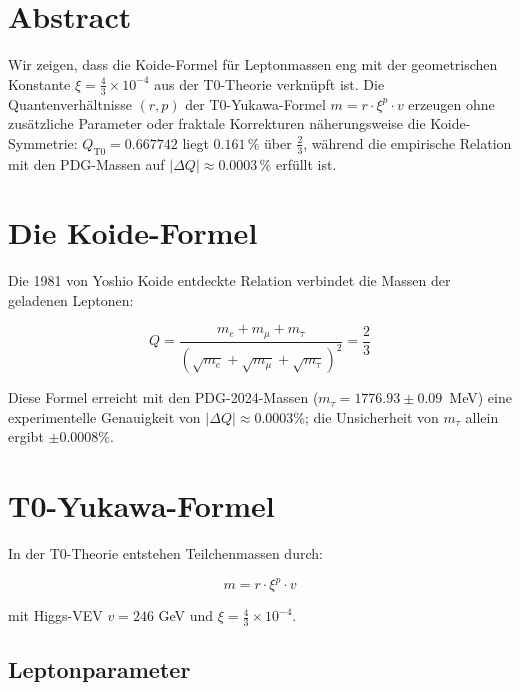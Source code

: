 \section*{Abstract}
		Wir zeigen, dass die Koide-Formel für Leptonmassen eng mit der geometrischen Konstante $\xi = \frac{4}{3} \times 10^{-4}$ aus der T0-Theorie verknüpft ist. Die Quantenverhältnisse $(r,p)$ der T0-Yukawa-Formel $m = r \cdot \xi^p \cdot v$ erzeugen ohne zusätzliche Parameter oder fraktale Korrekturen näherungsweise die Koide-Symmetrie: $Q_{\text{T0}} = 0.667742$ liegt $0.161\,\%$ über $\frac{2}{3}$, während die empirische Relation mit den PDG-Massen auf $|\Delta Q| \approx 0.0003\,\%$ erfüllt ist.

	
	\section{Die Koide-Formel}
	
	Die 1981 von Yoshio Koide entdeckte Relation verbindet die Massen der geladenen Leptonen:
	
	\begin{equation}
		Q = \frac{m_e + m_\mu + m_\tau}{\left( \sqrt{m_e} + \sqrt{m_\mu} + \sqrt{m_\tau} \right)^2} = \frac{2}{3}
		\label{eq:koide}
	\end{equation}
	
	Diese Formel erreicht mit den PDG-2024-Massen ($m_\tau = 1776.93 \pm 0.09$~MeV) eine experimentelle Genauigkeit von $|\Delta Q| \approx 0.0003\%$; die Unsicherheit von $m_\tau$ allein ergibt $\pm 0.0008\%$.
	
	\section{T0-Yukawa-Formel}
	
	In der T0-Theorie entstehen Teilchenmassen durch:
	
	\begin{equation}
		m = r \cdot \xi^p \cdot v
		\label{eq:t0yukawa}
	\end{equation}
	
	mit Higgs-VEV $v = 246$ GeV und $\xi = \frac{4}{3} \times 10^{-4}$.
	
	\subsection{Leptonparameter}
	
	\begin{table}[h]
		\centering
		\caption{T0-Quantenverhältnisse der geladenen Leptonen}
	\end{table}
	
